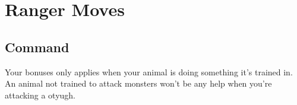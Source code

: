 \chapter{Ranger Moves}
   
 
\section{Command}   
 

Your bonuses only applies when your animal is doing something it's trained in. An animal not trained to attack monsters won't be any help when you're attacking a otyugh.

 
